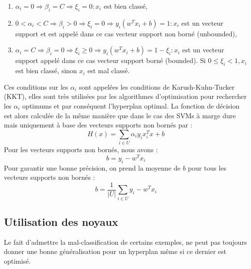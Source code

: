 \documentclass[12pt,a4paper]{report}
\begin{document}
\begin{enumerate}
	\item $\alpha_{i}=0 \Rightarrow \beta_{i}=C \Rightarrow \xi_{i}=0: x_{i}$ est bien classé,
	
	\item $0<\alpha_{i}<C \Rightarrow \beta_{i}>0 \Rightarrow \xi_{i}=0 \Rightarrow y_{i}\left(w^{T} x_{i}+b\right)=1: x_{i}$ est un vecteur support et est appelé dans ce cas vecteur support non borné (unbounded),
	
	\item $\alpha_{i}=C \Rightarrow \beta_{i}=0 \Rightarrow \xi_{i} \geq 0 \Rightarrow y_{i}\left(w^{T} x_{i}+b\right)=1-\xi_{i}: x_{i}$ est un vecteur support appelé dans ce cas vecteur support borné (bounded). Si $0 \leq \xi_{i}<1, x_{i}$ est bien classé, sinon $x_{i}$ est mal classé.
	
\end{enumerate}
Ces conditions sur les $\alpha_{i}$ sont appelées les conditions de Karush-Kuhn-Tucker (KKT), elles sont très utilisées par les algorithmes d'optimisation pour rechercher les $\alpha_{i}$ optimums et par conséquent l'hyperplan optimal. La fonction de décision est alors calculée de la même manière que dans le cas des SVMs à marge dure mais uniquement à base des vecteurs supports non bornés par :
$$
H(x)=\sum_{i \in U} \alpha_{i} y_{i} x_{i}^{T} x+b
$$
Pour les vecteurs supports non bornés, nous avons :
$$
b=y_{i}-w^{T} x_{i}
$$
Pour garantir une bonne précision, on prend la moyenne de $b$ pour tous les vecteurs supports non bornés :
$$
b=\frac{1}{|U|} \sum_{i \in U} y_{i}-w^{T} x_{i}
$$
\subsection{Utilisation des noyaux}
Le fait d'admettre la mal-classification de certains exemples, ne peut pas toujours donner une bonne généralisation pour un hyperplan même si ce dernier est optimisé.
\end{document}
